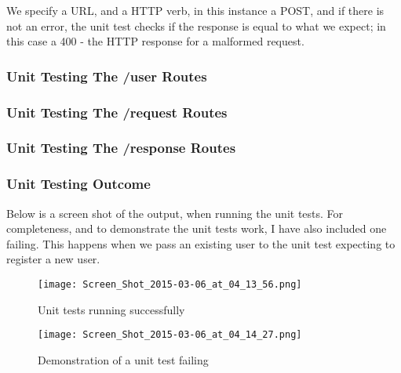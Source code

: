 \documentclass[a4paper]{article}
\begin{document}
We specify a URL, and a HTTP verb, in this instance a POST, and if there is not an error, the unit test checks if the response is equal to what we expect; in this case a 400 - the HTTP response for a malformed request.

\subsubsection{Unit Testing The /user Routes}
\begin{center}
\end{center}
\subsubsection{Unit Testing The /request Routes}
\begin{center}
\end{center}
\subsubsection{Unit Testing The /response Routes}
\begin{center}
\end{center}
\subsubsection{Unit Testing Outcome}
Below is a screen shot of the output, when running the unit tests. For completeness, and to demonstrate the unit tests work, I have also included one failing. This happens when we pass an existing user to the unit test expecting to register a new user.



\begin{figure}[H]

\centering
\texttt{[image: Screen\_Shot\_2015-03-06\_at\_04\_13\_56.png]}
\caption{Unit tests running successfully}
\end{figure}


\begin{figure}[H]

\centering
\texttt{[image: Screen\_Shot\_2015-03-06\_at\_04\_14\_27.png]}
\caption{Demonstration of a unit test failing}
\end{figure}
\end{document}
